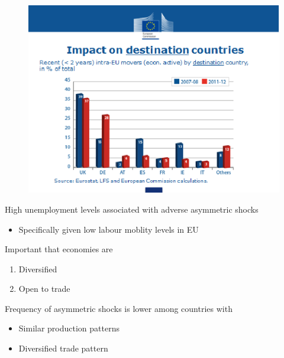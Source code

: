 \documentclass{beamer}
\begin{document}
\begin{frame}
  \begin{figure}
    \includegraphics[scale=.7]{eu_labour4.eps}
  \end{figure}
\end{frame}

\begin{frame}
  High unemployment levels associated with adverse asymmetric shocks
  \begin{itemize}
    \item Specifically given low labour moblity levels in EU
  \end{itemize}
  \medskip
  Important that economies are 
  \begin{enumerate}
    \item Diversified
    \item Open to trade
  \end{enumerate}
  \medskip 
  Frequency of asymmetric shocks is lower among countries with
  \begin{itemize}
    \item Similar production patterns
    \item Diversified trade pattern
  \end{itemize}
\end{frame}
\end{document}
